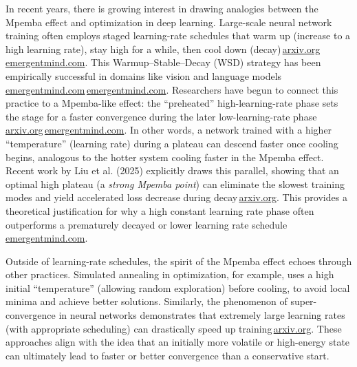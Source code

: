 \documentclass[11pt]{article}
\begin{document}
In recent years, there is growing interest in drawing analogies between the Mpemba effect and optimization in deep learning. Large-scale neural network training often employs staged learning-rate schedules that warm up (increase to a high learning rate), stay high for a while, then cool down (decay)\,\href{https://arxiv.org/html/2507.04206v1#:~:text=and the choice of plateau,exists an optimal plateau learning}{arxiv.org}\,\href{https://www.emergentmind.com/topics/warmup-stable-decay-wsd-schedules#:~:text=Notably%2C the greatest loss reduction,May 2025 %2C  25}{emergentmind.com}. This Warmup--Stable--Decay (WSD) strategy has been empirically successful in domains like vision and language models\,\href{https://www.emergentmind.com/topics/warmup-stable-decay-wsd-schedules#:~:text=Updated 16 July 2025}{emergentmind.com}\,\href{https://www.emergentmind.com/topics/warmup-stable-decay-wsd-schedules#:~:text=2}{emergentmind.com}. Researchers have begun to connect this practice to a Mpemba-like effect: the ``preheated'' high-learning-rate phase sets the stage for a faster convergence during the later low-learning-rate phase\,\href{https://arxiv.org/html/2507.04206v1#:~:text=Mpemba effect—a phenomenon in which,We derive analytical conditions for}{arxiv.org}\,\href{https://www.emergentmind.com/topics/warmup-stable-decay-wsd-schedules#:~:text=Notably%2C the greatest loss reduction,May 2025 %2C  25}{emergentmind.com}. In other words, a network trained with a higher ``temperature'' (learning rate) during a plateau can descend faster once cooling begins, analogous to the hotter system cooling faster in the Mpemba effect. Recent work by Liu et al. (2025) explicitly draws this parallel, showing that an optimal high plateau (a \emph{strong Mpemba point}) can eliminate the slowest training modes and yield accelerated loss decrease during decay\,\href{https://arxiv.org/html/2507.04206v1#:~:text=Mpemba effect—a phenomenon in which,We derive analytical conditions for}{arxiv.org}. This provides a theoretical justification for why a high constant learning rate phase often outperforms a prematurely decayed or lower learning rate schedule\,\href{https://www.emergentmind.com/topics/warmup-stable-decay-wsd-schedules#:~:text=Notably%2C the greatest loss reduction,May 2025 %2C  25}{emergentmind.com}.

Outside of learning-rate schedules, the spirit of the Mpemba effect echoes through other practices. Simulated annealing in optimization, for example, uses a high initial ``temperature'' (allowing random exploration) before cooling, to avoid local minima and achieve better solutions. Similarly, the phenomenon of super-convergence in neural networks demonstrates that extremely large learning rates (with appropriate scheduling) can drastically speed up training\,\href{https://arxiv.org/abs/1708.07120#:~:text=,simplification of the Hessian Free}{arxiv.org}. These approaches align with the idea that an initially more volatile or high-energy state can ultimately lead to faster or better convergence than a conservative start.
\end{document}
